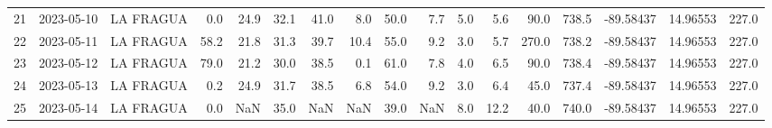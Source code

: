 \documentclass[12pt]{article}
\begin{document}
\begin{center}
\begin{tabular}{lllrrrrrrrrrrrrrr}
21  & 2023-05-10 &  LA FRAGUA &     0.0 &  24.9 &   32.1 &  41.0 &      8.0 &     50.0 &        7.7 &  5.0 &         5.6 &        90.0 &      738.5 & -89.58437 &  14.96553 &    227.0 \\
22  & 2023-05-11 &  LA FRAGUA &    58.2 &  21.8 &   31.3 &  39.7 &     10.4 &     55.0 &        9.2 &  3.0 &         5.7 &       270.0 &      738.2 & -89.58437 &  14.96553 &    227.0 \\
23  & 2023-05-12 &  LA FRAGUA &    79.0 &  21.2 &   30.0 &  38.5 &      0.1 &     61.0 &        7.8 &  4.0 &         6.5 &        90.0 &      738.4 & -89.58437 &  14.96553 &    227.0 \\
24  & 2023-05-13 &  LA FRAGUA &     0.2 &  24.9 &   31.7 &  38.5 &      6.8 &     54.0 &        9.2 &  3.0 &         6.4 &        45.0 &      737.4 & -89.58437 &  14.96553 &    227.0 \\
25  & 2023-05-14 &  LA FRAGUA &     0.0 &   NaN &   35.0 &   NaN &      NaN &     39.0 &        NaN &  8.0 &        12.2 &        40.0 &      740.0 & -89.58437 &  14.96553 &    227.0 \\
\bottomrule
\end{tabular}

        
        \end{center}
        
\end{document}
